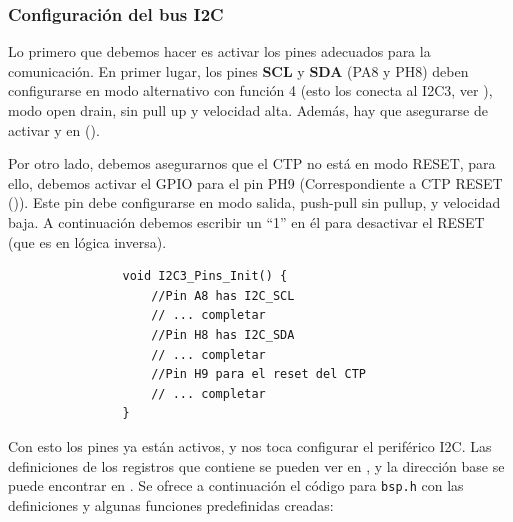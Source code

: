 \documentclass[../main.tex]{subfiles}
\begin{document}
        \subsubsection{Configuración del bus I2C}
            
            Lo primero que debemos hacer es activar los pines adecuados para la comunicación. En primer lugar, los pines \textbf{SCL} y \textbf{SDA} (PA8 y PH8) deben configurarse en modo alternativo con función 4 (esto los conecta al I2C3, ver \DSMAN[Table 12]), modo open drain, sin pull up y velocidad alta. Además, hay que asegurarse de activar  y  en  (\REFMAN[5.3.10]).

            Por otro lado, debemos asegurarnos que el CTP no está en modo RESET, para ello, debemos activar el GPIO para el pin PH9 (Correspondiente a CTP RESET ()). Este pin debe configurarse en modo salida, push-pull sin pullup, y velocidad baja. A continuación debemos escribir un ``1'' en él para desactivar el RESET (que es en lógica inversa).

            \begin{lstlisting}
                void I2C3_Pins_Init() {
                    //Pin A8 has I2C_SCL
                    // ... completar
                    //Pin H8 has I2C_SDA
                    // ... completar
                    //Pin H9 para el reset del CTP
                    // ... completar
                }         
            \end{lstlisting}

            Con esto los pines ya están activos, y nos toca configurar el periférico I2C. Las definiciones de los registros que contiene se pueden ver en \REFMAN[26.9], y la dirección base se puede encontrar en \REFMAN[1.6.2]. Se ofrece a continuación el código para \texttt{bsp.h} con las definiciones y algunas funciones predefinidas creadas:
\end{document}
